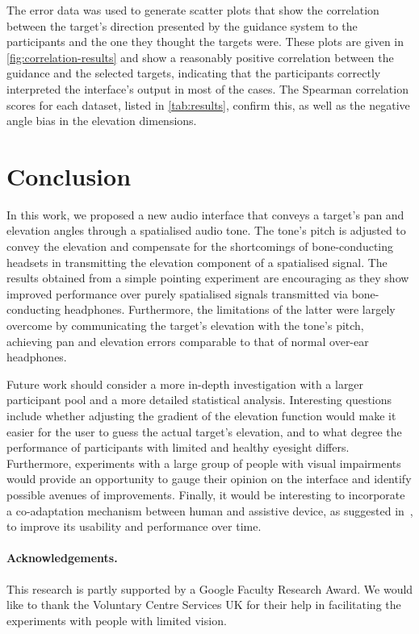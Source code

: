 \documentclass{llncs}
\begin{document}
The error data was used to generate scatter plots that show the correlation between the target's direction presented by the guidance system to the participants and the one they thought the targets were.
These plots are given in \cref{fig:correlation-results} and show a reasonably positive correlation between the guidance and the selected targets, indicating that the participants correctly interpreted the interface's output in most of the cases. 
The Spearman correlation scores for each dataset, listed in \cref{tab:results}, confirm this, as well as the negative angle bias in the elevation dimensions.

\section{Conclusion}\label{sec:conclusion}

In this work, we proposed a new audio interface that conveys a target's pan and elevation angles through a spatialised audio tone.
The tone's pitch is adjusted to convey the elevation and compensate for the shortcomings of bone-conducting headsets in transmitting the elevation component of a spatialised signal.
The results obtained from a simple pointing experiment are encouraging as they show improved performance over purely spatialised signals transmitted via bone-conducting headphones.
Furthermore, the limitations of the latter were largely overcome by communicating the target's elevation with the tone's pitch, achieving pan and elevation errors comparable to that of normal over-ear headphones.

Future work should consider a more in-depth investigation with a larger participant pool and a more detailed statistical analysis.
Interesting questions include whether adjusting the gradient of the elevation function would make it easier for the user to guess the actual target's elevation, and to what degree the performance of participants with limited and healthy eyesight differs.
Furthermore, experiments with a large group of people with visual impairments would provide an opportunity to gauge their opinion on the interface and identify possible avenues of improvements.
Finally, it would be interesting to incorporate a co-adaptation mechanism between human and assistive device, as suggested in~\cite{gallina2015progressive}, to improve its usability and performance over time.

\paragraph{{\bf Acknowledgements.}}\label{sec:acknowledge}
This research is partly supported by a Google Faculty Research Award.
We would like to thank the Voluntary Centre Services UK for their help in facilitating the experiments with people with limited vision. 



\end{document}
